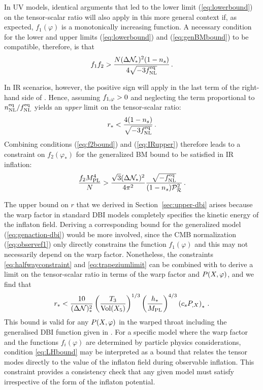 In UV models, identical arguments that led to 
the lower limit (\ref{eq:lowerbound}) on the tensor-scalar ratio
will also apply in this more general context if, as expected, $f_1 (\varphi) $ 
is a monotonically increasing function. A necessary condition for
the lower and upper limits
(\ref{eq:lowerbound}) and (\ref{eq:genBMbound}) to be compatible, therefore, is  
that  
% 
\begin{equation}
\label{eq:evade}
f_1f_2 > \frac{N (\Delta \mathcal{N}_*)^2 (1-n_s)}{4\sqrt{-3f_{\mathrm{NL}}^{\mathrm{eq}}}} \,.
\end{equation}
% 


In IR scenarios, however, the positive sign will apply in the 
last term of the right-hand side of .
Hence, assuming $f_{1,\varphi} >0$ and neglecting the term proportional to 
$n_{\mathrm{NL}}^{\mathrm{eq}}/f_{\mathrm{NL}}^{\mathrm{eq}}$ yields an {\em upper} limit on the tensor-scalar ratio:
% 
\begin{equation}
\label{eq:IRupper}
r_* < \frac{4(1-n_s)}{\sqrt{-3f_{\mathrm{NL}}^{\mathrm{eq}}}}  \,.
\end{equation}
% 
Combining conditions (\ref{eq:f2bound}) and (\ref{eq:IRupper}) 
therefore leads to a constraint on $f_2 (\varphi_*) $
for the generalized BM bound to be satisfied in IR inflation: 
% 
\begin{equation}
\label{eq:f2IRlower}
\frac{f_2M_{\mathrm{PL}}^4}{N} > \frac{\sqrt{3} (\Delta \mathcal{N}_*)^2}{4\pi^2}
\frac{\sqrt{-f_{\mathrm{NL}}^{\mathrm{eq}}}}{(1-n_s)\mathcal{P}_{\mathcal{R}}^2 }  \,.
\end{equation}
% 

The upper bound on $r$ that we derived in Section~\ref{sec:upper-dbi} arises 
because the warp factor in standard DBI models 
completely specifies the kinetic 
energy of the inflaton field. Deriving a corresponding bound for 
the generalized model (\ref{eq:genaction-dbi}) would be more involved, 
since the CMB normalization (\ref{eq:observef1}) only 
directly constrains the function 
$f_1 (\varphi )$ and this may not necessarily depend on the warp factor. 
Nonetheless, the constraints \eqref{eq:halfwayconstraint} and
\eqref{eq:trapeziumlimit} can be 
combined with  to derive a limit 
on the tensor-scalar ratio in terms of the warp factor and $P(X,\varphi)$, and we find
that 
% 
\begin{equation}
\label{eq:LHbound}
r_* < \frac{10}{(\Delta \mathcal{N})_*^2} \left( \frac{T_3}{\mathrm{Vol} (X_5)} \right)^{1/3} 
\left( \frac{h_*}{M_{\mathrm{PL}}} \right)^{4/3} \left( c_s P_{,X} \right)_* \,.
\end{equation}
% 
This bound is valid for any $P(X,\varphi)$ in the warped throat including the
generalised DBI function given in .
For a specific model where the warp factor and 
the functions $f_i (\varphi )$ are determined by particle 
physics considerations,   
condition \eqref{eq:LHbound} 
may be interpreted as a bound that relates 
the tensor modes directly to the value of the inflaton field during observable 
inflation. This constraint provides a consistency 
check that any given model must satisfy 
irrespective of the form of the inflaton potential. 
% 


